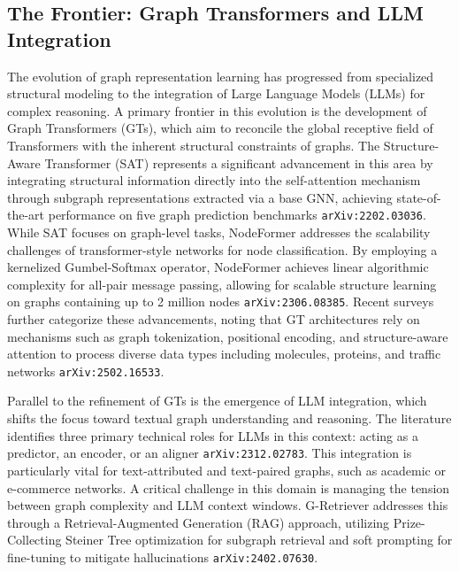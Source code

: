 \documentclass[11pt]{article}
\begin{document}
\subsection{The Frontier: Graph Transformers and LLM Integration}

The evolution of graph representation learning has progressed from specialized structural modeling to the integration of Large Language Models (LLMs) for complex reasoning. A primary frontier in this evolution is the development of Graph Transformers (GTs), which aim to reconcile the global receptive field of Transformers with the inherent structural constraints of graphs. The Structure-Aware Transformer (SAT) represents a significant advancement in this area by integrating structural information directly into the self-attention mechanism through subgraph representations extracted via a base GNN, achieving state-of-the-art performance on five graph prediction benchmarks \texttt{arXiv:2202.03036}. While SAT focuses on graph-level tasks, NodeFormer addresses the scalability challenges of transformer-style networks for node classification. By employing a kernelized Gumbel-Softmax operator, NodeFormer achieves linear algorithmic complexity for all-pair message passing, allowing for scalable structure learning on graphs containing up to 2 million nodes \texttt{arXiv:2306.08385}. Recent surveys further categorize these advancements, noting that GT architectures rely on mechanisms such as graph tokenization, positional encoding, and structure-aware attention to process diverse data types including molecules, proteins, and traffic networks \texttt{arXiv:2502.16533}.

Parallel to the refinement of GTs is the emergence of LLM integration, which shifts the focus toward textual graph understanding and reasoning. The literature identifies three primary technical roles for LLMs in this context: acting as a predictor, an encoder, or an aligner \texttt{arXiv:2312.02783}. This integration is particularly vital for text-attributed and text-paired graphs, such as academic or e-commerce networks. A critical challenge in this domain is managing the tension between graph complexity and LLM context windows. G-Retriever addresses this through a Retrieval-Augmented Generation (RAG) approach, utilizing Prize-Collecting Steiner Tree optimization for subgraph retrieval and soft prompting for fine-tuning to mitigate hallucinations \texttt{arXiv:2402.07630}.
\end{document}
